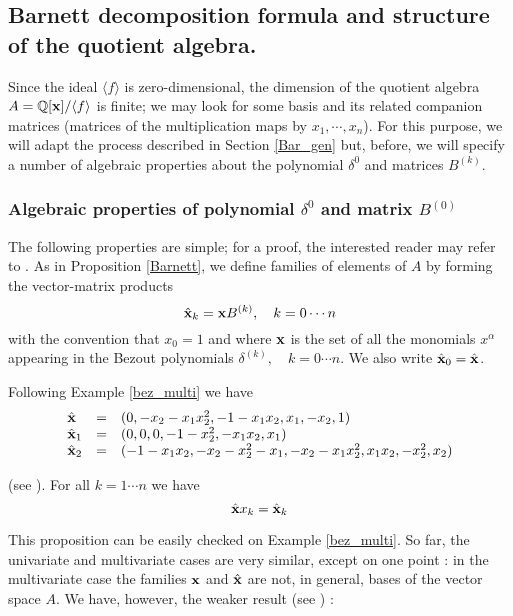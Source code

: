 \documentclass{standalone}
\begin{document}
\subsection{Barnett decomposition formula and structure of the quotient algebra.}
Since the ideal $\langle f\rangle$ is zero-dimensional, the dimension of the quotient algebra $A = \mathbb{Q}[\bold{x}]/\langle f\rangle$ is finite; we may look for some basis and its related companion matrices (matrices of the multiplication maps by $x_1,\cdots, x_n$). 
For this purpose, we will adapt the process described in Section \ref{Bar_gen} but, before, we will specify a number of algebraic properties about the polynomial $\delta^0$ and matrices $B^{(k)}$.
\subsubsection{Algebraic properties of polynomial $\delta^0$ and matrix $B^{(0)}$}
The following properties are simple; for a proof, the interested reader may refer to \cite{jpc}. As in Proposition \ref{Barnett}, we define families of elements of $A$ by forming the vector-matrix products
\begin{equation}
		\hat{\bold{x}}_k  =  \bold{x}B^{(k)}, \quad k=0\cdots n
\end{equation}
with the convention that $x_0=1$ and where $\bold{x}$ is the set of all the monomials $x^\alpha$ appearing in the Bezout polynomials $\delta^{(k)}, \quad k=0\cdots n$. We also write $\hat{\bold{x}}_0 = \hat{\bold{x}}$.
\begin{exmp}
Following Example \ref{bez_multi} we have
\begin{equation}
	\begin{array}{lll}
		\hat{\bold{x}} & = & (0, -x_2 - x_1x_2^2, -1 - x_1x_2, x_1, -x_2, 1) \\
		\hat{\bold{x}}_1 & = & (0, 0, 0, -1 - x_2^2, -x_1x_2, x_1) \\
		\hat{\bold{x}}_2 & = & (-1 - x_1x_2, -x_2 - x_2^2 - x_1, - x_2 - x_1x_2^2, x_1x_2, -x_2^2, x_2)
	\end{array}
\end{equation}
\end{exmp}

\begin{prop}
\label{xj} (see \cite{jpc}).
For all $k=1\cdots n$ we have
\begin{equation}
    \hat{\bold{x}}x_k = \hat{\bold{x}}_k
\end{equation}
\end{prop}
This proposition can be easily checked on Example \ref{bez_multi}. 
So far, the univariate and multivariate cases are very similar, except on one point : in the multivariate case the families $\bold{x}$ and $\hat{\bold{x}}$ are not, in general, bases of the vector space $A$. We have, however, the weaker result (see \cite{jpc}) :
\end{document}
